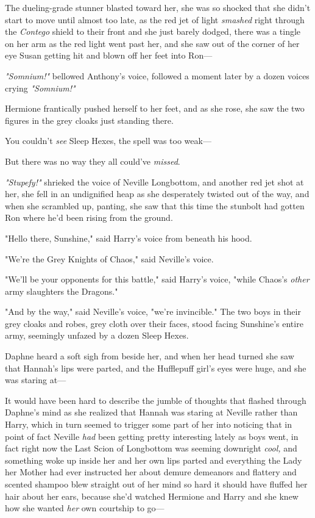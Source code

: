 The dueling-grade stunner blasted toward her, she was so shocked that she
didn't start to move until almost too late, as the red jet of light
\emph{smashed} right through the \emph{Contego} shield to their front and she
just barely dodged, there was a tingle on her arm as the red light went past
her, and she saw out of the corner of her eye Susan getting hit and blown off
her feet into Ron\mbox{---}

\emph{"Somnium!"} bellowed Anthony's voice, followed a moment later by a dozen
voices crying \emph{"Somnium!"}

Hermione frantically pushed herself to her feet, and as she rose, she saw the
two figures in the grey cloaks just standing there.

You couldn't \emph{see} Sleep Hexes, the spell was too weak\mbox{---}

But there was no way they all could've \emph{missed}.

\emph{"Stupefy!"} shrieked the voice of Neville Longbottom, and another red jet
shot at her, she fell in an undignified heap as she desperately twisted out of
the way, and when she scrambled up, panting, she saw that this time the
stunbolt had gotten Ron where he'd been rising from the ground.

"Hello there, Sunshine," said Harry's voice from beneath his hood.

"We're the Grey Knights of Chaos," said Neville's voice.

"We'll be your opponents for this battle," said Harry's voice, "while Chaos's
\emph{other} army slaughters the Dragons."

"And by the way," said Neville's voice, "we're invincible."
\sbreak
The two boys in their grey cloaks and robes, grey cloth over their faces, stood
facing Sunshine's entire army, seemingly unfazed by a dozen Sleep Hexes.

Daphne heard a soft sigh from beside her, and when her head turned she saw that
Hannah's lips were parted, and the Hufflepuff girl's eyes were huge, and she
was staring at\mbox{---}

It would have been hard to describe the jumble of thoughts that flashed through
Daphne's mind as she realized that Hannah was staring at Neville rather than
Harry, which in turn seemed to trigger some part of her into noticing that in
point of fact Neville \emph{had} been getting pretty interesting lately as boys
went, in fact right now the Last Scion of Longbottom was seeming downright
\emph{cool,} and something woke up inside her and her own lips parted and
everything the Lady her Mother had ever instructed her about demure demeanors
and flattery and scented shampoo blew straight out of her mind so hard it
should have fluffed her hair about her ears, because she'd watched Hermione and
Harry and she knew how she wanted \emph{her} own courtship to go\mbox{---}


